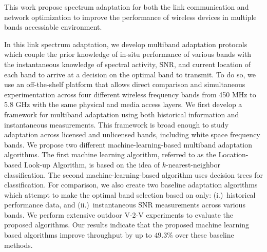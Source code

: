 This work propose spectrum adaptation for both the link communication and network 
optimization to improve the performance of wireless devices in multiple bands 
accessiable environment.

In this link spectrum adaptation, we develop multiband adaptation protocols 
which couple the prior knowledge of in-situ performance of various bands with the instantaneous knowledge of 
spectral activity, SNR, and current location of each band to arrive at a decision on the optimal band to transmit. 
To do so, we use an off-the-shelf platform that allows direct comparison and simultaneous experimentation across four different wireless
frequency bands from 450 MHz to 5.8 GHz with the same physical and media access layers. 
We first develop a framework for multiband adaptation using both historical information and 
instantaneous measurements. This framework is broad enough to study adaptation across 
licensed and unlicensed bands, including white space frequency bands.  
We propose two different machine-learning-based multiband adaptation algorithms. The 
first machine learning algorithm, referred to as the Location-based 
Look-up Algorithm, 
is based on the idea of $k$-nearest-neighbor classification. 
The second machine-learning-based algorithm uses decision trees for classification. 
For comparison, we also create two baseline adaptation algorithms which attempt to 
make the optimal band selection based on only: (i.)~historical 
performance data, and (ii.)~instantaneous SNR measurements across 
various bands. 
We perform extensive outdoor V-2-V experiments to evaluate the proposed algorithms.
Our results indicate that the proposed machine learning based algorithms improve
throughput by up to $49.3\%$ over these baseline methods.


